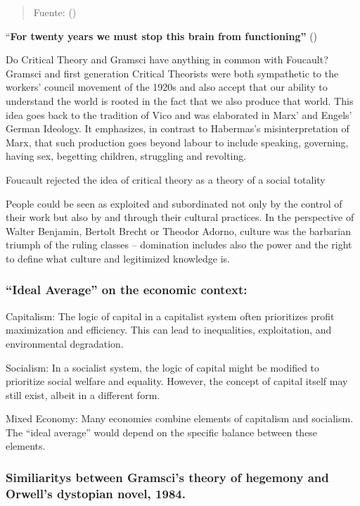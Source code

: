 \documentclass[
  letterpaper,
  DIV=11,
  numbers=noendperiod]{scrreprt}
\begin{document}
\begin{quote}
Fuente: ()
\end{quote}

``\textbf{For twenty years we must stop this brain from functioning''}
()

Do Critical Theory and Gramsci have anything in common with Foucault?
Gramsci and first generation Critical Theorists were both sympathetic to
the workers' council movement of the 1920s and also accept that our
ability to understand the world is rooted in the fact that we also
produce that world. This idea goes back to the tradition of Vico and was
elaborated in Marx' and Engels' German Ideology. It emphasizes, in
contrast to Habermas's misinterpretation of Marx, that such production
goes beyond labour to include speaking, governing, having sex, begetting
children, struggling and revolting.

Foucault rejected the idea of critical theory as a theory of a social
totality

People could be seen as exploited and subordinated not only by the
control of their work but also by and through their cultural practices.
In the perspective of Walter Benjamin, Bertolt Brecht or Theodor Adorno,
culture was the barbarian triumph of the ruling classes -- domination
includes also the power and the right to define what culture and
legitimized knowledge is.

\subsubsection{``Ideal Average'' on the economic
context:}\label{ideal-average-on-the-economic-context}

Capitalism: The logic of capital in a capitalist system often
prioritizes profit maximization and efficiency. This can lead to
inequalities, exploitation, and environmental degradation.

Socialism: In a socialist system, the logic of capital might be modified
to prioritize social welfare and equality. However, the concept of
capital itself may still exist, albeit in a different form.

Mixed Economy: Many economies combine elements of capitalism and
socialism. The ``ideal average'' would depend on the specific balance
between these elements.

\subsubsection{Similiaritys between Gramsci's theory of hegemony and
Orwell's dystopian novel,
1984.}\label{similiaritys-between-gramscis-theory-of-hegemony-and-orwells-dystopian-novel-1984.}
\end{document}
